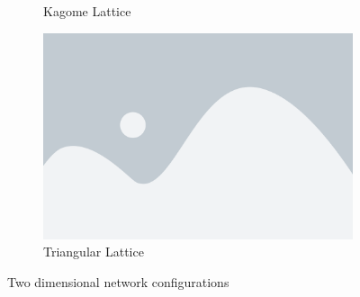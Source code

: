 \begin{figure}[p]
\begin{subfigure}[b]{0.45\textwidth}
    \caption{Kagome Lattice}
    \label{fig:kagome lattice}
  \end{subfigure}
  \hfill
  \begin{subfigure}[b]{0.45\textwidth}
    \centering
    \includegraphics[width=\textwidth]{placeholder}
    \caption{Triangular Lattice}
    \label{fig:triangular lattice}
  \end{subfigure}
  \caption{Two dimensional network configurations}
  \label{fig:two dimensional networks}
\end{figure}
